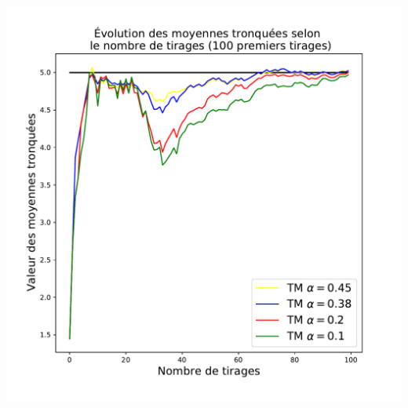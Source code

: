 \documentclass[8pt, sans]{beamer}
\begin{document}
\begin{frame}
\begin{columns}[T]
\begin{column}{0.5\linewidth}
\includegraphics[scale=0.3]{mt-100.pdf}

\end{column}

\end{columns}

\vfill


\end{frame}
\end{document}
